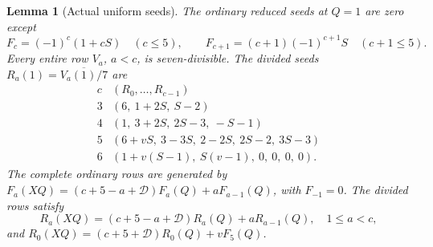 \documentclass[11pt]{article}
\newtheorem{lemma}{Lemma}\newtheorem{theorem}{Theorem}
\begin{document}
\begin{lemma}[Actual uniform seeds]\label{lem:seeds}
The ordinary reduced seeds at $Q=1$ are zero except
\[
 F_c=(-1)^c(1+cS)\quad(c\le5),\qquad
 F_{c+1}=(c+1)(-1)^{c+1}S\quad(c+1\le5).
\]
Every entire row $V_a$, $a<c$, is seven-divisible.
The divided seeds $R_a(1)=\overline{V_a(1)/7}$ are
\[
\begin{array}{c|l}
 c& (R_0,\ldots,R_{c-1})\\\hline
3&(6,\ 1+2S,\ S-2)\\
4&(1,\ 3+2S,\ 2S-3,\ -S-1)\\
5&(6+vS,\ 3-3S,\ 2-2S,\ 2S-2,\ 3S-3)\\
6&(1+v(S-1),\ S(v-1),\ 0,\ 0,\ 0,\ 0).
\end{array}
\]
The complete ordinary rows are generated by
$F_a(XQ)=(c+5-a+\mathscr D)F_a(Q)+aF_{a-1}(Q)$,
with $F_{-1}=0$.
The divided rows satisfy
\[
 R_a(XQ)=(c+5-a+\mathscr D)R_a(Q)+aR_{a-1}(Q),\quad1\le a<c,
\]
and
$R_0(XQ)=(c+5+\mathscr D)R_0(Q)+vF_5(Q)$.
\end{lemma}
\end{document}
